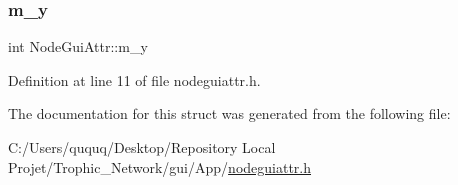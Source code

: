 \mbox{\label{struct_node_gui_attr_aa0e7b15590cc2a32cb82799770298975}} 
\subsubsection{\texorpdfstring{m\+\_\+y}{m\_y}}
{\footnotesize\ttfamily int Node\+Gui\+Attr\+::m\+\_\+y}



Definition at line 11 of file nodeguiattr.\+h.



The documentation for this struct was generated from the following file\+:\begin{DoxyCompactItemize}
\item 
C\+:/\+Users/ququq/\+Desktop/\+Repository Local Projet/\+Trophic\+\_\+\+Network/gui/\+App/\mbox{\hyperlink{nodeguiattr_8h}{nodeguiattr.\+h}}\end{DoxyCompactItemize}
